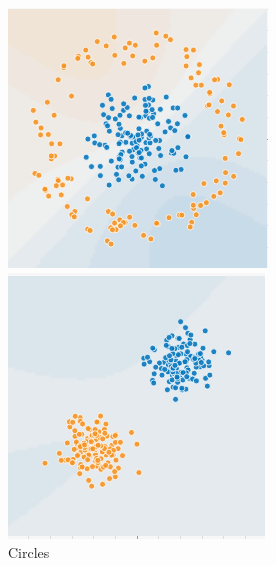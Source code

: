 \begin{figure}[!htb]
  \includegraphics[width=\linewidth]{plots/Circles}
  \caption{Circles}\label{}
\endminipage\hfill
{}
  \includegraphics[width=\linewidth]{plots/Clusters}

\end{figure}
